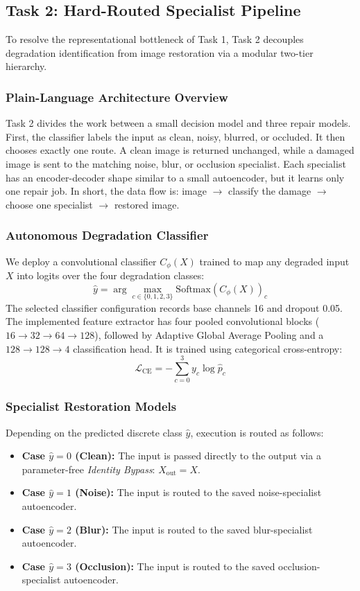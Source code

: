 \documentclass[journal,compsoc]{IEEEtran}
\begin{document}
\subsection{Task 2: Hard-Routed Specialist Pipeline}
To resolve the representational bottleneck of Task 1, Task 2 decouples degradation identification from image restoration via a modular two-tier hierarchy.

\subsubsection{Plain-Language Architecture Overview}
Task 2 divides the work between a small decision model and three repair models. First, the classifier labels the input as clean, noisy, blurred, or occluded. It then chooses exactly one route. A clean image is returned unchanged, while a damaged image is sent to the matching noise, blur, or occlusion specialist. Each specialist has an encoder-decoder shape similar to a small autoencoder, but it learns only one repair job. In short, the data flow is: image $\rightarrow$ classify the damage $\rightarrow$ choose one specialist $\rightarrow$ restored image.

\subsubsection{Autonomous Degradation Classifier}
We deploy a convolutional classifier $C_\phi(X)$ trained to map any degraded input $X$ into logits over the four degradation classes:
\begin{equation}
    \hat{y} = \arg\max_{c \in \{0, 1, 2, 3\}} \text{Softmax}(C_\phi(X))_c
\end{equation}
The selected classifier configuration records base channels 16 and dropout 0.05. The implemented feature extractor has four pooled convolutional blocks ($16\to32\to64\to128$), followed by Adaptive Global Average Pooling and a $128\to128\to4$ classification head. It is trained using categorical cross-entropy:
\begin{equation}
    \mathcal{L}_{\text{CE}} = -\sum_{c=0}^3 y_c \log \hat{p}_c
\end{equation}

\subsubsection{Specialist Restoration Models}
Depending on the predicted discrete class $\hat{y}$, execution is routed as follows:
\begin{itemize}
    \item \textbf{Case $\hat{y} = 0$ (Clean):} The input is passed directly to the output via a parameter-free \textit{Identity Bypass}: $X_{\text{out}} = X$.
    \item \textbf{Case $\hat{y} = 1$ (Noise):} The input is routed to the saved noise-specialist autoencoder.
    \item \textbf{Case $\hat{y} = 2$ (Blur):} The input is routed to the saved blur-specialist autoencoder.
    \item \textbf{Case $\hat{y} = 3$ (Occlusion):} The input is routed to the saved occlusion-specialist autoencoder.
\end{itemize}
\end{document}

